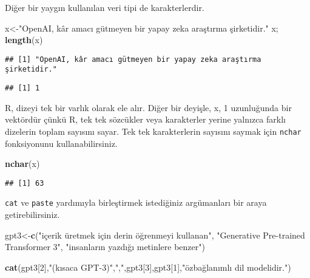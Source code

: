 \documentclass[
]{book}
\newenvironment{Shaded}{\begin{snugshade}}{\end{snugshade}}
\newcommand{\DecValTok}[1]{\textcolor[rgb]{0.00,0.00,0.81}{#1}}
\newcommand{\KeywordTok}[1]{\textcolor[rgb]{0.13,0.29,0.53}{\textbf{#1}}}
\newcommand{\NormalTok}[1]{#1}
\newcommand{\StringTok}[1]{\textcolor[rgb]{0.31,0.60,0.02}{#1}}
\begin{document}
Diğer bir yaygın kullanılan veri tipi de karakterlerdir.

\begin{Shaded}
\begin{Highlighting}[]
\NormalTok{x<-}\StringTok{"OpenAI, kâr amacı gütmeyen bir yapay zeka araştırma şirketidir."}
\NormalTok{x; }\KeywordTok{length}\NormalTok{(x)}
\end{Highlighting}
\end{Shaded}

\begin{verbatim}
## [1] "OpenAI, kâr amacı gütmeyen bir yapay zeka araştırma şirketidir."
\end{verbatim}

\begin{verbatim}
## [1] 1
\end{verbatim}

R, dizeyi tek bir varlık olarak ele alır. Diğer bir deyişle, x, 1 uzunluğunda bir vektördür çünkü R, tek tek sözcükler veya karakterler yerine yalnızca farklı dizelerin toplam sayısını sayar. Tek tek karakterlerin sayısını saymak için \texttt{nchar} fonksiyonunu kullanabilirsiniz.

\begin{Shaded}
\begin{Highlighting}[]
\KeywordTok{nchar}\NormalTok{(x)}
\end{Highlighting}
\end{Shaded}

\begin{verbatim}
## [1] 63
\end{verbatim}

\texttt{cat} ve \texttt{paste} yardımıyla birleştirmek istediğiniz argümanları bir araya getirebilirsiniz.

\begin{Shaded}
\begin{Highlighting}[]
\NormalTok{gpt3<-}\KeywordTok{c}\NormalTok{(}\StringTok{"içerik üretmek için derin öğrenmeyi kullanan"}\NormalTok{,}
        \StringTok{"Generative Pre-trained Transformer 3"}\NormalTok{,}
        \StringTok{"insanların yazdığı metinlere benzer"}\NormalTok{)}
\end{Highlighting}
\end{Shaded}

\begin{Shaded}
\begin{Highlighting}[]
\KeywordTok{cat}\NormalTok{(gpt3[}\DecValTok{2}\NormalTok{],}\StringTok{"(kısaca GPT-3)"}\NormalTok{,}\StringTok{","}\NormalTok{,gpt3[}\DecValTok{3}\NormalTok{],gpt3[}\DecValTok{1}\NormalTok{],}\StringTok{"özbağlanımlı dil modelidir."}\NormalTok{)}
\end{Highlighting}
\end{Shaded}
\end{document}
